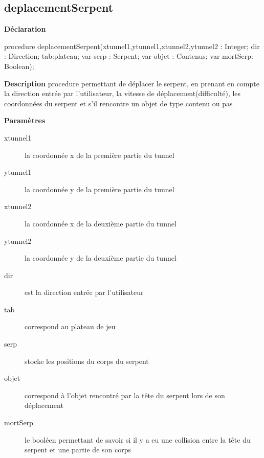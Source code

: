 \documentclass{report}
\newif\ifpdf
\begin{document}
\subsection*{deplacementSerpent}
\fi
\label{Deplacement-deplacementSerpent}
\begin{list}{}{
\setlength{\itemindent}{0cm}
\setlength{\listparindent}{0cm}
\setlength{\leftmargin}{\evensidemargin}
\addtolength{\leftmargin}{\tmplength}
\settowidth{\labelsep}{X}
\addtolength{\leftmargin}{\labelsep}
\setlength{\labelwidth}{\tmplength}
}
\item[\textbf{Déclaration}\hfill]
\ifpdf
\begin{flushleft}
\fi
\begin{ttfamily}
procedure deplacementSerpent(xtunnel1,ytunnel1,xtunnel2,ytunnel2 : Integer; dir : Direction; tab:plateau; var serp : Serpent; var objet : Contenus; var mortSerp: Boolean);\end{ttfamily}

\ifpdf
\end{flushleft}
\fi

\par
\item[\textbf{Description}]
procedure permettant de déplacer le serpent, en prenant en compte la direction entrée par l'utilisateur, la vitesse de déplacement(difficulté), les coordonnées du serpent et s'il rencontre un objet de type contenu ou pas         \par
\item[\textbf{Paramètres}]
\begin{description}
\item[xtunnel1] la coordonnée x de la première partie du tunnel
\item[ytunnel1] la coordonnée y de la première partie du tunnel
\item[xtunnel2] la coordonnée x de la deuxième partie du tunnel
\item[ytunnel2] la coordonnée y de la deuxième partie du tunnel
\item[dir] est la direction entrée par l'utilisateur
\item[tab] correspond au plateau de jeu
\item[serp] stocke les positions du corps du serpent
\item[objet] correspond à l'objet rencontré par la tête du serpent lors de son déplacement
\item[mortSerp] le booléen permettant de savoir si il y a eu une collision entre la tête du serpent et une partie de son corps
\end{description}


\end{list}
\end{document}
